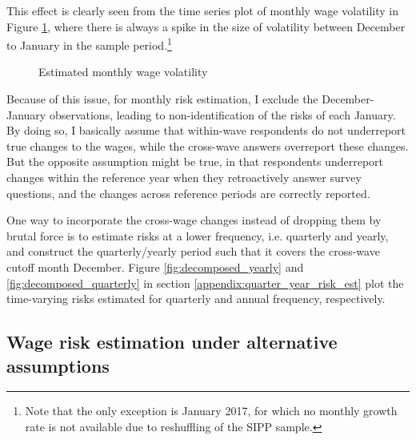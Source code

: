 This effect is clearly seen from the time series plot of monthly wage volatility in Figure \ref{fig:volatility_monthly_seam}, where there is always a spike in the size of volatility between December to January in the sample period.\footnote{Note that the only exception is January 2017, for which no monthly growth rate is not available due to reshuffling of the SIPP sample.}

 \begin{figure}[!ht]
    	\caption{Estimated monthly wage volatility}
    	\label{fig:volatility_monthly_seam}
    	\begin{center}
    	\end{center}
    \end{figure}

Because of this issue, for monthly risk estimation, I exclude the December-January observations, leading to non-identification of the risks of each January. By doing so, I basically assume that within-wave respondents do not underreport true changes to the wages, while the cross-wave answers overreport these changes. But the opposite assumption might be true, in that respondents underreport changes within the reference year when they retroactively answer survey questions, and the changes across reference periods are correctly reported.

One way to incorporate the cross-wage changes instead of dropping them by brutal force is to estimate risks at a lower frequency, i.e. quarterly and yearly, and construct  the quarterly/yearly period such that it covers the cross-wave cutoff month December. Figure \ref{fig:decomposed_yearly} and \ref{fig:decomposed_quarterly} in section \ref{appendix:quarter_year_risk_est} plot the time-varying risks estimated for quarterly and annual frequency, respectively. 

\subsection{Wage risk estimation under alternative assumptions}

